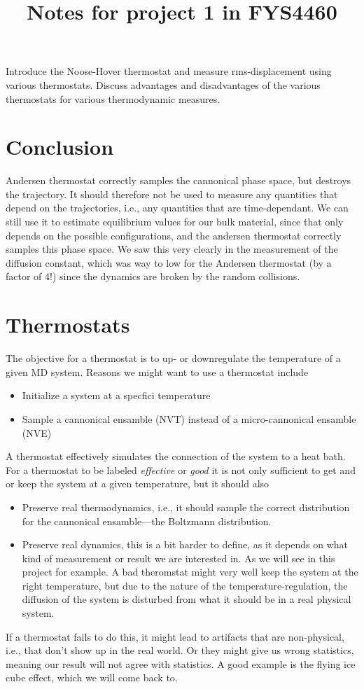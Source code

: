 \documentclass[a4paper, 11pt, notitlepage, english]{article}
\author{}
\title{Notes for project 1 in FYS4460}
\begin{document}
Introduce the Noose-Hover thermostat and measure rms-displacement using various
thermostats. Discuss advantages and disadvantages of the various thermostats
for various thermodynamic measures.


\section*{Conclusion}

Andersen thermostat correctly samples the cannonical phase space, but destroys the trajectory. It should therefore not be used to measure any quantities that depend on the trajectories, i.e., any quantities that are time-dependant. We can still use it to estimate equilibrium values for our bulk material, since that only depends on the possible configurations, and the andersen thermostat correctly samples this phase space. We saw this very clearly in the measurement of the diffusion constant, which was way to low for the Andersen thermostat (by a factor of 4!) since the dynamics are broken by the random collisions.


\section*{Thermostats}

The objective for a thermostat is to up- or downregulate the temperature of a given MD system. Reasons we might want to use a thermostat include
\begin{itemize}
	\item Initialize a system at a specfici temperature
	\item Sample a cannonical ensamble (NVT) instead of a micro-cannonical ensamble (NVE)
\end{itemize}

A thermostat effectively simulates the connection of the system to a heat bath. For a thermostat to be labeled \emph{effective} or \emph{good} it is not only sufficient to get and or keep the system at a given temperature, but it should also
\begin{itemize}
	\item Preserve real thermodynamics, i.e., it should sample the correct distribution for the cannonical ensamble---the Boltzmann distribution.
	\item Preserve real dynamics, this is a bit harder to define, as it depends on what kind of measurement or result we are interested in. As we will see in this project for example. A bad theromstat might very well keep the system at the right temperature, but due to the nature of the temperature-regulation, the diffusion of the system is disturbed from what it should be in a real physical system.
\end{itemize}
If a thermostat fails to do this, it might lead to artifacts that are non-physical, i.e., that don't show up in the real world. Or they might give us wrong statistics, meaning our result will not agree with statistics. A good example is the flying ice cube effect, which we will come back to.
\end{document}
